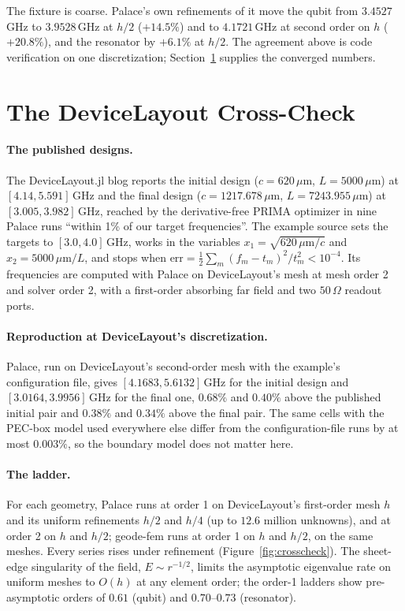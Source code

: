 \documentclass{anvil-paper}
\begin{document}
The fixture is coarse. Palace's own refinements of it move the qubit from
$3.4527$\,GHz to $3.9528$\,GHz at $h/2$ ($+14.5\%$) and to $4.1721$\,GHz
at second order on $h$ ($+20.8\%$), and the resonator by $+6.1\%$ at
$h/2$. The agreement above is code verification on one discretization;
Section~\ref{sec:crosscheck} supplies the converged numbers.

\section{The DeviceLayout Cross-Check}
\label{sec:crosscheck}

\paragraph{The published designs.}
The DeviceLayout.jl blog \citep{devicelayout-blog} reports the initial
design ($c = 620\,\mu$m, $L = 5000\,\mu$m) at $[4.14, 5.591]$\,GHz and
the final design ($c = 1217.678\,\mu$m, $L = 7243.955\,\mu$m) at
$[3.005, 3.982]$\,GHz, reached by the derivative-free PRIMA optimizer in
nine Palace runs ``within 1\% of our target frequencies''. The example
source \citep{devicelayout-example} sets the targets to $[3.0, 4.0]$\,GHz,
works in the variables $x_1 = \sqrt{620\,\mu\mathrm{m}/c}$ and $x_2 =
5000\,\mu\mathrm{m}/L$, and stops when $\mathrm{err} = \frac12\sum_m
(f_m - t_m)^2/t_m^2 < 10^{-4}$. Its frequencies are computed with Palace
on DeviceLayout's mesh at mesh order 2 and solver order 2, with a
first-order absorbing far field and two $50\,\Omega$ readout ports.

\paragraph{Reproduction at DeviceLayout's discretization.}
Palace, run on DeviceLayout's second-order mesh with the example's
configuration file, gives $[4.1683, 5.6132]$\,GHz for the initial design
and $[3.0164, 3.9956]$\,GHz for the final one, $0.68\%$ and $0.40\%$
above the published initial pair and $0.38\%$ and $0.34\%$ above the
final pair. The same cells with the PEC-box model used everywhere else
differ from the configuration-file runs by at most $0.003\%$, so the
boundary model does not matter here.

\paragraph{The ladder.}
For each geometry, Palace runs at order 1 on DeviceLayout's first-order
mesh $h$ and its uniform refinements $h/2$ and $h/4$ (up to
$12.6$ million unknowns), and at order 2 on $h$ and $h/2$; geode-fem runs
at order 1 on $h$ and $h/2$, on the same meshes. Every series rises
under refinement (Figure~\ref{fig:crosscheck}). The sheet-edge
singularity of the field, $E \sim r^{-1/2}$, limits the asymptotic
eigenvalue rate on uniform meshes to $O(h)$ at any element order; the
order-1 ladders show pre-asymptotic orders of $0.61$ (qubit) and
$0.70$--$0.73$ (resonator).
\end{document}
